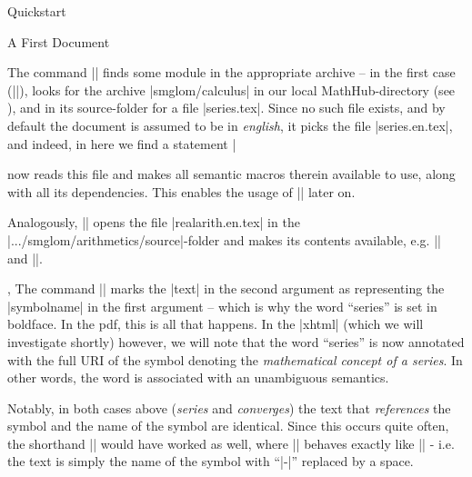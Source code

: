 \begin{omgroup}{Quickstart}
\begin{omgroup}{A First \sTeX Document}
    \begin{function}{\usemodule}
      The command ||
      finds some module in the appropriate archive -- in the first
      case (||), \sTeX
      looks for the archive |smglom/calculus| in our local
      MathHub-directory (see ), and
      in its source-folder for a file |series.tex|. Since no such
      file exists, and by default the document is assumed to be
      in \emph{english}, it picks the file |series.en.tex|, and
      indeed, in here we find a statement |\fi
      
      \sTeX now reads this file and makes all semantic macros therein
      available to use, along with all its dependencies.
      This enables the usage of |\infinitesum| later on.

      Analogously, ||
      opens the file |realarith.en.tex| in the |.../smglom/arithmetics/source|-folder
      and makes its contents available, e.g. |\realdivide| and |\realpower|.
    \end{function}

    \begin{function}{\symref,\symname}
      The command || marks the |text|
      in the second argument as representing the |symbolname|
      in the first argument -- which is why the word ``series''
      is set in boldface. In the pdf, this is all that happens.
      In the |xhtml| (which we will investigate shortly) however,
      we will note that the word ``series'' is now annotated with the
      full URI of the symbol denoting the \emph{mathematical concept of
      a series}. In other words, the word is associated with an unambiguous
      semantics.

      Notably, in both cases above (\emph{series} and \emph{converges})
      the text that \emph{references} the symbol and the name of the symbol
      are identical. Since this occurs quite often, the shorthand
      || would have worked as well, where
      || behaves exactly like ||
      - i.e. the text is simply the name of the symbol with ``|-|'' replaced by
      a space.
    \end{function}


\end{omgroup}
\end{omgroup}
